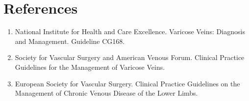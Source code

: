 \section*{References}
\begin{enumerate}
  \item National Institute for Health and Care Excellence. Varicose Veins: Diagnosis and Management. Guideline CG168.
  \item Society for Vascular Surgery and American Venous Forum. Clinical Practice Guidelines for the Management of Varicose Veins.
  \item European Society for Vascular Surgery. Clinical Practice Guidelines on the Management of Chronic Venous Disease of the Lower Limbs.
\end{enumerate}

\clearpage
